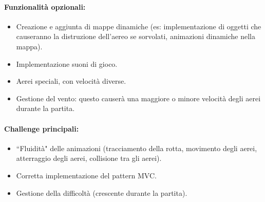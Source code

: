 \documentclass[a4paper,12pt]{report}
\begin{document}
\paragraph{Funzionalità opzionali:}
\begin{itemize}
    \item Creazione e aggiunta di mappe dinamiche (es: implementazione di oggetti che causeranno la distruzione dell’aereo se sorvolati, animazioni dinamiche nella mappa).
    
    \item Implementazione suoni di gioco.
    
    \item Aerei speciali, con velocità diverse.
    
    \item Gestione del vento: questo causerà una maggiore o minore velocità degli aerei durante la partita.
\end{itemize}

\paragraph{\textbf{Challenge principali:}}
\begin{itemize}
    \item “Fluidità" delle animazioni (tracciamento della rotta, movimento degli aerei, atterraggio degli aerei, collisione tra gli aerei).
    
    \item Corretta implementazione del pattern MVC.
    \item Gestione della difficoltà (crescente durante la partita).
\end{itemize}

\end{document}

